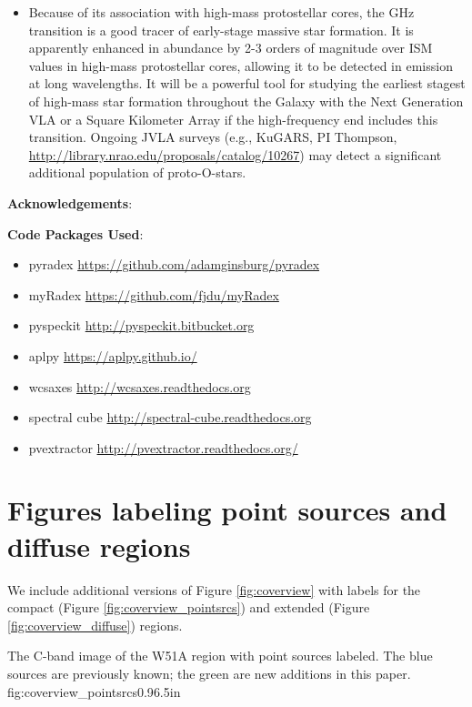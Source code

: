 \begin{itemize}
\item Because of its association with high-mass protostellar cores,
    the \formaldehyde {} GHz transition is a good tracer of
    early-stage massive star formation.  It is apparently enhanced in
    abundance by 2-3
orders of magnitude over ISM values in high-mass protostellar cores, allowing
it to be detected in emission at long wavelengths.  It will be a powerful tool
for studying the earliest stagest of high-mass star formation throughout the
Galaxy with the Next Generation VLA or a Square Kilometer Array if the
high-frequency end includes this transition.  Ongoing JVLA surveys (e.g.,
KuGARS, PI Thompson, \url{http://library.nrao.edu/proposals/catalog/10267}) may
detect a significant additional population of proto-O-stars.

\end{itemize}




\textbf{Acknowledgements}:

\textbf{Code Packages Used}:

\begin{itemize}
    \item pyradex \url{https://github.com/adamginsburg/pyradex}
    \item myRadex \url{https://github.com/fjdu/myRadex}
    \item pyspeckit \url{http://pyspeckit.bitbucket.org}
    \item aplpy \url{https://aplpy.github.io/}
    \item wcsaxes \url{http://wcsaxes.readthedocs.org}
    \item spectral cube \url{http://spectral-cube.readthedocs.org}
    \item pvextractor \url{http://pvextractor.readthedocs.org/}
\end{itemize}



\appendix
\section{Figures labeling point sources and diffuse regions}
\label{sec:appendix_labels}
We include additional versions of Figure \ref{fig:coverview} with labels for
the compact (Figure \ref{fig:coverview_pointsrcs}) and extended (Figure
\ref{fig:coverview_diffuse}) \hii regions.

{The C-band image of the W51A region with point sources labeled.  The blue
sources are previously known; the green are new additions in this paper.}
{fig:coverview_pointsrcs}{0.9}{6.5in}

